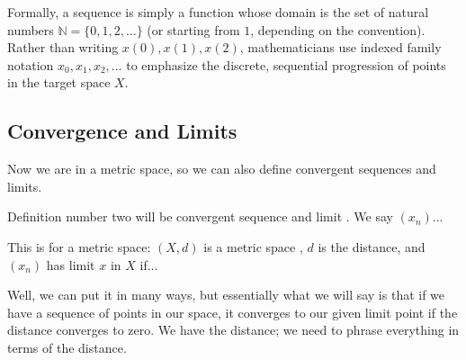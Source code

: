 \begin{content}


\begin{steps}
Formally, a sequence is simply a function whose domain is the set of natural numbers $\mathbb{N} = \{0, 1, 2, \dots\}$ (or starting from $1$, depending on the convention). Rather than writing $x(0), x(1), x(2)$, mathematicians use indexed family notation $x_0, x_1, x_2, \dots$ to emphasize the discrete, sequential progression of points in the target space $X$.
\end{steps}
\end{content}

\subsection{Convergence and Limits}

\begin{speech}[00:02:55 - 00:04:33]
Now we are in a metric space, so we can also define convergent sequences and limits.

Definition number two will be convergent sequence and limit . We say $(x_n)$... 

This is for a metric space: $(X, d)$ is a metric space , $d$ is the distance, and $(x_n)$ has limit $x$ in $X$  if...

Well, we can put it in many ways, but essentially what we will say is that if we have a sequence of points in our space, it converges to our given limit point if the distance converges to zero. We have the distance; we need to phrase everything in terms of the distance.
\end{speech}

